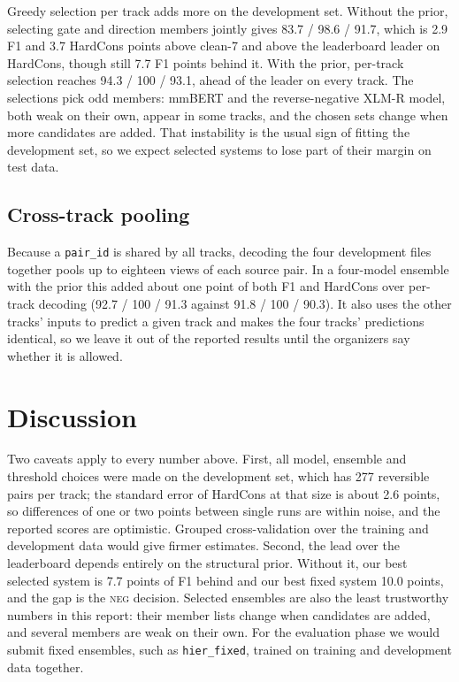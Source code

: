 \documentclass[conference]{IEEEtran}
\newcommand{\NEG}{\textsc{neg}}
\begin{document}
Greedy selection per track adds more on the development set. Without the
prior, selecting gate and direction members jointly gives 83.7 / 98.6 / 91.7,
which is 2.9 F1 and 3.7 HardCons points above clean-7 and above the
leaderboard leader on HardCons, though still 7.7 F1 points behind it. With the
prior, per-track selection reaches 94.3 / 100 / 93.1, ahead of the leader on
every track. The selections pick odd members: mmBERT and the reverse-negative
XLM-R model, both weak on their own, appear in some tracks, and the chosen
sets change when more candidates are added. That instability is the usual sign
of fitting the development set, so we expect selected systems to lose part of
their margin on test data.



\subsection{Cross-track pooling}
Because a \texttt{pair\_id} is shared by all tracks, decoding the four
development files together pools up to eighteen views of each source pair. In
a four-model ensemble with the prior this added about one point of both F1
and HardCons over per-track decoding (92.7 / 100 / 91.3 against
91.8 / 100 / 90.3). It also uses the other tracks' inputs to predict a
given track and makes the four tracks' predictions identical, so we leave it
out of the reported results until the organizers say whether it is allowed.

\section{Discussion}

Two caveats apply to every number above. First, all model, ensemble and
threshold choices were made on the development set, which has 277 reversible
pairs per track; the standard error of HardCons at that size is about 2.6
points, so differences of one or two points between single runs are within
noise, and the reported scores are optimistic. Grouped cross-validation over
the training and development data would give firmer estimates. Second, the
lead over the leaderboard depends entirely on the structural prior. Without
it, our best selected system is 7.7 points of F1 behind and our best fixed
system 10.0 points, and the gap is the \NEG{} decision. Selected ensembles
are also the least trustworthy numbers in this report: their member lists
change when candidates are added, and several members are weak on their own.
For the evaluation phase we would submit fixed ensembles, such as
\texttt{hier\_fixed}, trained on training and development data together.
\end{document}
